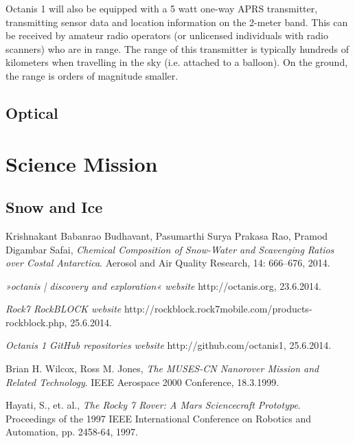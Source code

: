 \documentclass[a4paper,12pt]{article}
\begin{document}
Octanis 1 will also be equipped with a 5 watt one-way APRS transmitter, transmitting sensor data and location information on the 2-meter band. This can be received by amateur radio operators (or unlicensed individuals with radio scanners) who are in range. The range of this transmitter is typically hundreds of kilometers when travelling in the sky (i.e. attached to a balloon). On the ground, the range is orders of magnitude smaller.


\subsection{Optical}



\section{Science Mission}

\subsection{Snow and Ice}

\cite{krishnakant} 


\pagebreak
\pagestyle{empty}
\begin{thebibliography}{1}


  Krishnakant Babanrao Budhavant, Pasumarthi Surya Prakasa Rao, Pramod Digambar Safai,
  \emph{Chemical Composition of Snow-Water and Scavenging Ratios over Costal Antarctica}.
  Aerosol and Air Quality Research, 14: 666–676, 2014.

{\em »octanis | discovery and exploration« website} http://octanis.org, 23.6.2014.

{\em Rock7 RockBLOCK website} http://rockblock.rock7mobile.com/products-rockblock.php, 25.6.2014.


{\em Octanis 1 GitHub repositories website} http://github.com/octanis1, 25.6.2014.

  Brian H. Wilcox, Ross M. Jones, 
  \emph{The MUSES-CN Nanorover Mission and Related Technology}.
  IEEE Aerospace 2000 Conference, 18.3.1999.


  Hayati, S., et. al., 
  \emph{The Rocky 7 Rover: A Mars Sciencecraft Prototype}.
  Proceedings of the 1997 IEEE International Conference on Robotics and Automation, pp. 2458-64, 1997.



\end{thebibliography}
\end{document}
